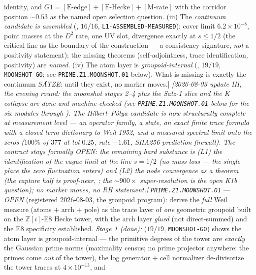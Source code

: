{identity, and $G1=[\mathrm{E\mbox{-}edge}]+[\mathrm{E\mbox{-}Hecke}]
+[\mathrm{M\mbox{-}rate}]$ with the corridor position $\sim0.53$ as
the named open selection question.  (iii) The \emph{continuum
candidate is assembled} (, $16/16$,
\texttt{L1-ASSEMBLED-MEASURED}): cover limit $6.2\times10^{-8}$,
point masses at the $D^2$ rate, one UV slot, divergence exactly at
$s\le1/2$ (the critical line as the boundary of the construction ---
a consistency signature, \emph{not} a positivity statement); the
missing theorems (self-adjointness, trace identification,
positivity) are \emph{named}.  (iv) The atom layer is
\emph{groupoid-internal} (,
$19/19$, \texttt{MOONSHOT-GO}; see
\texttt{PRIME.Z1.MOONSHOT.01} below).  What is missing is exactly
the continuum \emph{S\"ATZE}: until they exist, no marker moves.]}
\emph{[2026-08-03 update III, the evening round: the moonshot
stages 2--4 plus the Satz-1 slice and the K collapse are \emph{done
and machine-checked} (see \texttt{PRIME.Z1.MOONSHOT.01} below for
the six modules  through
).  The Hilbert--P\'olya candidate
is now structurally complete \emph{at measurement level} --- an
operator family, a state, an exact finite trace formula with a
closed term dictionary to Weil 1952, and a measured spectral limit
onto the zeros ($100\%$ of $377$ at tol $0.25$, rate $-1.61$,
SHA256 prediction firewall).  The contract stays \emph{formally
OPEN}: the remaining hard substance is (L1) the identification of
the vague limit \emph{at} the line $s=1/2$ (no mass loss --- the
single place the zero fluctuation enters) and (L2) the node
convergence as a theorem (the capture half is proof-near,
; the ${\sim}900\times$
super-resolution is the open K1b question); no marker moves, no RH
statement.]}
\emph{\texttt{PRIME.Z1.MOONSHOT.01}} --- \emph{OPEN} (registered
2026-08-03, the groupoid program): derive the \emph{full} Weil
measure (atoms $+$ arch $+$ pole) as the trace layer of \emph{one}
geometric groupoid built on the $\mathbb{Z}[i]$-E8 Hecke tower, with
the arch layer \emph{glued} (not direct-summed) and the E8
specificity established.  \emph{Stage 1 (done):}
 ($19/19$,
\texttt{MOONSHOT-GO}) shows the atom layer is groupoid-internal ---
the primitive degrees of the tower are \emph{exactly} the Gaussian
prime norms (maximality census; no prime projector anywhere: the
primes come \emph{out} of the tower), the log generator $+$ cell
normalizer de-divisorize the tower traces at $4\times10^{-13}$, and
